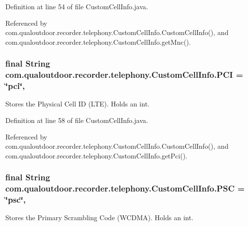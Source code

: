 Definition at line 54 of file Custom\-Cell\-Info.\-java.



Referenced by com.\-qualoutdoor.\-recorder.\-telephony.\-Custom\-Cell\-Info.\-Custom\-Cell\-Info(), and com.\-qualoutdoor.\-recorder.\-telephony.\-Custom\-Cell\-Info.\-get\-Mnc().

\hypertarget{classcom_1_1qualoutdoor_1_1recorder_1_1telephony_1_1CustomCellInfo_adab6d65fadb5d7a446f5a8c10eab8a79}{
\subsubsection[{P\-C\-I}]{\setlength{\rightskip}{0pt plus 5cm}final String com.\-qualoutdoor.\-recorder.\-telephony.\-Custom\-Cell\-Info.\-P\-C\-I = \char`\"{}pci\char`\"{}\hspace{0.3cm}{\ttfamily [static]}, {\ttfamily [private]}}}\label{classcom_1_1qualoutdoor_1_1recorder_1_1telephony_1_1CustomCellInfo_adab6d65fadb5d7a446f5a8c10eab8a79}
Stores the Physical Cell I\-D (L\-T\-E). Holds an int. 

Definition at line 58 of file Custom\-Cell\-Info.\-java.



Referenced by com.\-qualoutdoor.\-recorder.\-telephony.\-Custom\-Cell\-Info.\-Custom\-Cell\-Info(), and com.\-qualoutdoor.\-recorder.\-telephony.\-Custom\-Cell\-Info.\-get\-Pci().

\hypertarget{classcom_1_1qualoutdoor_1_1recorder_1_1telephony_1_1CustomCellInfo_a350eb321837733c01ad938780171b5d9}{
\subsubsection[{P\-S\-C}]{\setlength{\rightskip}{0pt plus 5cm}final String com.\-qualoutdoor.\-recorder.\-telephony.\-Custom\-Cell\-Info.\-P\-S\-C = \char`\"{}psc\char`\"{}\hspace{0.3cm}{\ttfamily [static]}, {\ttfamily [private]}}}\label{classcom_1_1qualoutdoor_1_1recorder_1_1telephony_1_1CustomCellInfo_a350eb321837733c01ad938780171b5d9}
Stores the Primary Scrambling Code (W\-C\-D\-M\-A). Holds an int. 

